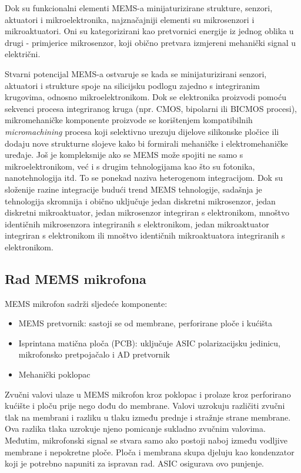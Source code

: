 Dok su funkcionalni elementi MEMS-a minijaturizirane strukture, senzori, aktuatori i mikroelektronika, najznačajniji elementi su mikrosenzori i mikroaktuatori. Oni su  kategorizirani kao pretvornici energije iz jednog oblika u drugi - primjerice mikrosenzor, koji obično pretvara izmjereni mehanički signal u električni.

Stvarni potencijal MEMS-a ostvaruje se kada se minijaturizirani senzori, aktuatori i strukture spoje na silicijsku podlogu zajedno s integriranim krugovima, odnosno mikroelektronikom. Dok se elektronika proizvodi pomoću sekvenci procesa integriranog kruga (npr. CMOS, bipolarni ili BICMOS procesi), mikromehaničke komponente proizvode se korištenjem kompatibilnih \textit{micromachining} procesa koji selektivno urezuju dijelove silikonske pločice ili dodaju nove strukturne slojeve kako bi formirali mehaničke i elektromehaničke uređaje. Još je kompleksnije ako se MEMS može spojiti ne samo s mikroelektronikom, već i s drugim tehnologijama kao što su fotonika, nanotehnologija itd. To se ponekad naziva heterogenom integracijom. Dok su složenije razine integracije budući trend MEMS tehnologije, sadašnja je tehnologija skromnija i obično uključuje jedan diskretni mikrosenzor, jedan diskretni mikroaktuator, jedan mikrosenzor integriran s elektronikom, mnoštvo identičnih mikrosenzora integriranih s elektronikom, jedan mikroaktuator integriran s elektronikom ili mnoštvo identičnih mikroaktuatora integriranih s elektronikom. 
 

\subsection{Rad MEMS mikrofona}

MEMS mikrofon sadrži sljedeće komponente:
\begin{itemize}
	\item MEMS pretvornik: sastoji se od membrane, perforirane ploče i kućišta
	\item Isprintana matična ploča (PCB): uključuje ASIC polarizacijsku jedinicu, mikrofonsko pretpojačalo i AD pretvornik
	\item Mehanički poklopac
\end{itemize}

Zvučni valovi ulaze u MEMS mikrofon kroz poklopac i prolaze kroz perforirano kućište i ploču prije nego dođu do membrane. Valovi uzrokuju različiti zvučni tlak na membrani i razliku u tlaku između prednje i stražnje strane membrane. Ova razlika tlaka uzrokuje njeno pomicanje sukladno zvučnim valovima. Međutim, mikrofonski signal se stvara samo ako postoji naboj između vodljive membrane i nepokretne ploče. Ploča i membrana skupa djeluju kao kondenzator koji je potrebno napuniti za ispravan rad. ASIC osigurava ovo punjenje.

